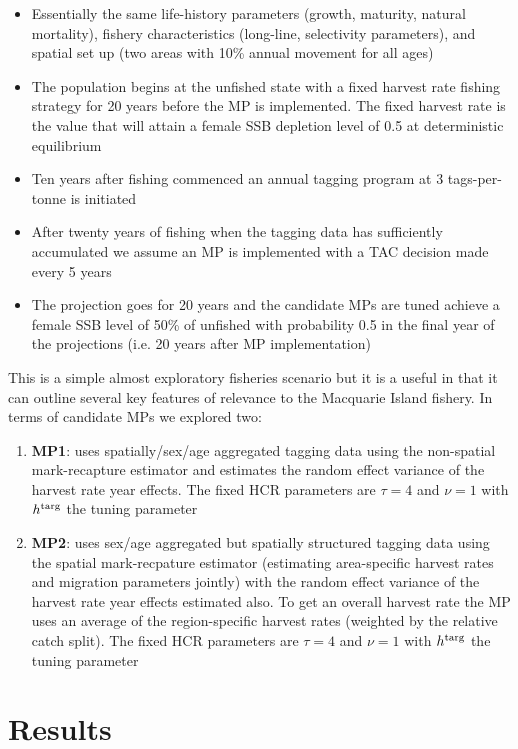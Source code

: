 \documentclass[12pt,a4paper,twoside,times,sky,standard]{csiroreport2017}
\begin{document}
\begin{itemize}
    \item Essentially the same life-history parameters (growth, maturity, natural mortality), fishery characteristics (long-line, selectivity parameters), and spatial set up (two areas with 10\% annual movement for all ages)
    \item The population begins at the unfished state with a fixed harvest rate fishing strategy for 20 years before the MP is implemented. The fixed harvest rate is the value that will attain a female SSB depletion level of 0.5 at deterministic equilibrium
    \item Ten years after fishing commenced an annual tagging program at 3 tags-per-tonne is initiated 
    \item After twenty years of fishing when the tagging data has sufficiently accumulated we assume an MP is implemented with a TAC decision made every 5 years
    \item The projection goes for 20 years and the candidate MPs are tuned achieve a female SSB level of 50\% of unfished with probability 0.5 in the final year of the projections (i.e. 20 years after MP implementation)
\end{itemize}

This is a simple almost exploratory fisheries scenario but it is a useful  in that it can outline several key features of relevance to the Macquarie Island fishery. In terms of candidate MPs we explored two:

\begin{enumerate}
    \item \textbf{MP1}: uses spatially/sex/age aggregated tagging data using the non-spatial mark-recapture estimator and estimates the random effect variance of the harvest rate year effects. The fixed HCR parameters are $\tau=4$ and $\nu=1$ with $h^{\rm targ}$ the tuning parameter
    \item \textbf{MP2}: uses sex/age aggregated but spatially structured tagging data using the spatial mark-recpature estimator (estimating area-specific harvest rates and migration parameters jointly)  with the random effect variance of the harvest rate year effects estimated also. To get an overall harvest rate the MP uses an average of the region-specific harvest rates (weighted by the relative catch split). The fixed HCR parameters are $\tau=4$ and $\nu=1$ with $h^{\rm targ}$ the tuning parameter
\end{enumerate}

\section{Results}
\end{document}
